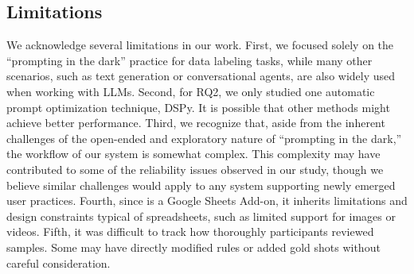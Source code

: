 
%




\subsection{Limitations}
We acknowledge several limitations in our work. 
First, we focused solely on the ``prompting in the dark'' practice for data labeling tasks, while many other scenarios, such as text generation or conversational agents, are also widely used when working with LLMs.
Second, for RQ2, we only studied one automatic prompt optimization technique, DSPy. 
It is possible that other methods might achieve better performance. 
Third, we recognize that, aside from the inherent challenges of the open-ended and exploratory nature of ``prompting in the dark,'' the workflow of our system is somewhat complex. 
This complexity may have contributed to some of the reliability issues observed in our study, though we believe similar challenges would apply to any system supporting newly emerged user practices. 
Fourth, since \system is a Google Sheets Add-on, it inherits limitations and design constraints typical of spreadsheets, 
such as limited support for images or videos.
Fifth, it was difficult to track how thoroughly participants reviewed samples. 
Some may have directly modified rules or added gold shots without careful consideration.
